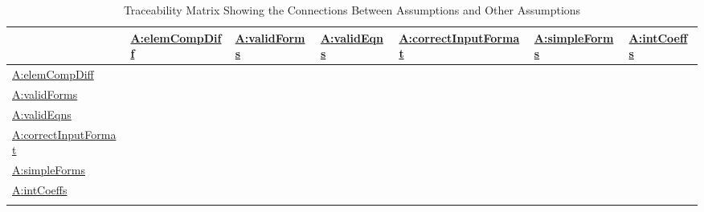 \documentclass[12pt]{article}
\begin{document}
\begin{longtable}{l l l l l l l}
\toprule
\textbf{} & \textbf{\hyperref[elemCompDiff]{A:elemCompDiff}} & \textbf{\hyperref[validForms]{A:validForms}} & \textbf{\hyperref[validEqns]{A:validEqns}} & \textbf{\hyperref[correctInputFormat]{A:correctInputFormat}} & \textbf{\hyperref[simpleForms]{A:simpleForms}} & \textbf{\hyperref[intCoeffs]{A:intCoeffs}}
\\
\midrule
\endhead
\hyperref[elemCompDiff]{A:elemCompDiff} &  &  &  &  &  & 
\\
\hyperref[validForms]{A:validForms} &  &  &  &  &  & 
\\
\hyperref[validEqns]{A:validEqns} &  &  &  &  &  & 
\\
\hyperref[correctInputFormat]{A:correctInputFormat} &  &  &  &  &  & 
\\
\hyperref[simpleForms]{A:simpleForms} &  &  &  &  &  & 
\\
\hyperref[intCoeffs]{A:intCoeffs} &  &  &  &  &  & 
\\
\bottomrule
\caption{Traceability Matrix Showing the Connections Between Assumptions and Other Assumptions}
\label{Table:TraceMatAvsA}
\end{longtable}
\end{document}
